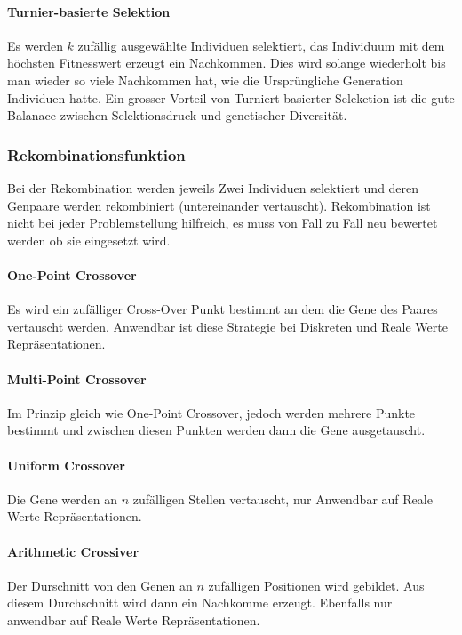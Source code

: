       \paragraph{Turnier-basierte Selektion}
        Es werden \(k\) zufällig ausgewählte Individuen selektiert, das Individuum mit dem höchsten Fitnesswert erzeugt ein Nachkommen. Dies wird solange wiederholt bis man wieder so viele Nachkommen hat,
        wie die Ursprüngliche Generation Individuen hatte. Ein grosser Vorteil von Turniert-basierter Seleketion ist die gute Balanace zwischen Selektionsdruck und genetischer Diversität.

    \subsubsection{Rekombinationsfunktion}
        Bei der Rekombination werden jeweils Zwei Individuen selektiert und deren Genpaare werden rekombiniert (untereinander vertauscht).
        Rekombination ist nicht bei jeder Problemstellung hilfreich, es muss von Fall zu Fall neu bewertet werden ob sie eingesetzt wird.

        \paragraph{One-Point Crossover}
          Es wird ein zufälliger Cross-Over Punkt bestimmt an dem die Gene des Paares vertauscht werden.
          Anwendbar ist diese Strategie bei Diskreten und Reale Werte Repräsentationen.

        \paragraph{Multi-Point Crossover}
          Im Prinzip gleich wie One-Point Crossover, jedoch werden mehrere Punkte bestimmt und
          zwischen diesen Punkten werden dann die Gene ausgetauscht.

        \paragraph{Uniform Crossover}
          Die Gene werden an \(n\) zufälligen Stellen vertauscht, nur Anwendbar auf Reale Werte Repräsentationen.

        \paragraph{Arithmetic Crossiver}
          Der Durschnitt von den Genen an \(n\) zufälligen Positionen wird gebildet.
          Aus diesem Durchschnitt wird dann ein Nachkomme erzeugt.
          Ebenfalls nur anwendbar auf Reale Werte Repräsentationen.

